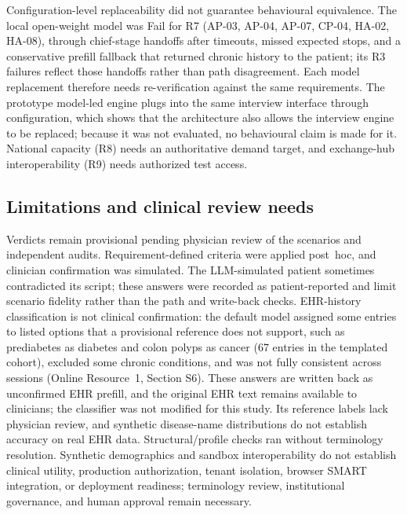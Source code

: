 \documentclass[lineno,pdflatex,sn-basic]{sn-jnl}%
\theoremstyle{thmstyleone}%
\theoremstyle{thmstyletwo}%
\theoremstyle{thmstylethree}%
\newcommand{\RSevenFailingScripts}{AP-03, AP-04, AP-07, CP-04, HA-02, HA-08}
\newcommand{\EThreeLocalSwapVerdict}{Fail}
\newcommand{\EOnePrefillListedDisagree}{67}
\begin{document}
Configuration-level replaceability did not guarantee behavioural equivalence. The
local open-weight model was \EThreeLocalSwapVerdict{} for R7 (\RSevenFailingScripts{}),
through chief-stage handoffs after timeouts, missed expected stops, and a
conservative prefill fallback that returned chronic history to the patient; its R3
failures reflect those handoffs rather than path disagreement. Each model
replacement therefore needs re-verification against the same requirements.
The prototype model-led engine plugs into the same interview interface through
configuration, which shows that the architecture also allows the interview engine
to be replaced; because it was not evaluated, no behavioural claim is made for it.
National capacity (R8) needs an authoritative demand target, and exchange-hub
interoperability (R9) needs authorized test access.

\subsection{Limitations and clinical review needs}
Verdicts remain provisional pending physician review of the scenarios and
independent audits. Requirement-defined criteria were applied post~hoc, and
clinician confirmation was simulated. The LLM-simulated patient sometimes
contradicted its script; these answers were recorded as patient-reported and limit
scenario fidelity rather than the path and write-back checks. EHR-history
classification is not clinical confirmation: the default model assigned some
entries to listed options that a provisional reference does not support, such as
prediabetes as diabetes and colon polyps as cancer
(\EOnePrefillListedDisagree{} entries in the templated cohort), excluded some
chronic conditions, and was not fully consistent across sessions (Online
Resource~1, Section S6). These answers are written back as unconfirmed EHR prefill,
and the original EHR text remains available to clinicians; the classifier was not
modified for this study. Its reference labels lack physician review, and synthetic
disease-name distributions do not establish accuracy on real EHR data.
Structural/profile checks ran without terminology resolution. Synthetic
demographics and sandbox interoperability do not establish clinical utility,
production authorization, tenant isolation, browser SMART integration, or
deployment readiness; terminology review, institutional governance, and human
approval remain necessary.
\end{document}
